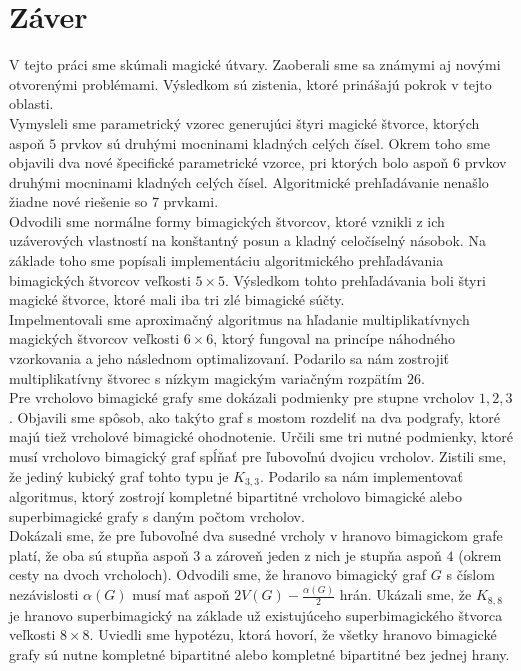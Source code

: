 \chapter*{Záver}  %

V tejto práci sme skúmali magické útvary. Zaoberali sme sa známymi aj novými otvorenými problémami. Výsledkom sú zistenia, ktoré prinášajú pokrok v tejto oblasti. \\

Vymysleli sme parametrický vzorec generujúci štyri magické štvorce, ktorých aspoň $5$ prvkov sú druhými mocninami kladných celých čísel. Okrem toho sme objavili dva nové špecifické parametrické vzorce, pri ktorých bolo aspoň $6$ prvkov druhými mocninami kladných celých čísel. Algoritmické prehľadávanie nenašlo žiadne nové riešenie so $7$ prvkami. \\

Odvodili sme normálne formy bimagických štvorcov, ktoré vznikli z ich uzáverových vlastností na konštantný posun a kladný celočíselný násobok. Na základe toho sme popísali implementáciu algoritmického prehľadávania bimagických štvorcov veľkosti $5 \times 5$. Výsledkom tohto prehľadávania boli štyri magické štvorce, ktoré mali iba tri zlé bimagické súčty. \\

Impelmentovali sme aproximačný algoritmus na hľadanie multiplikatívnych magických štvorcov veľkosti $6 \times 6$, ktorý fungoval na princípe náhodného vzorkovania a jeho následnom optimalizovaní. Podarilo sa nám zostrojiť multiplikatívny štvorec s nízkym magickým variačným rozpätím $26$. \\

Pre vrcholovo bimagické grafy sme dokázali podmienky pre stupne vrcholov $1, 2, 3$. Objavili sme spôsob, ako takýto graf s mostom rozdeliť na dva podgrafy, ktoré majú tiež vrcholové bimagické ohodnotenie. Určili sme tri nutné podmienky, ktoré musí vrcholovo bimagický graf spĺňať pre ľubovoľnú dvojicu vrcholov. Zistili sme, že jediný kubický graf tohto typu je $K_{3,3}$. Podarilo sa nám implementovať algoritmus, ktorý zostrojí kompletné bipartitné vrcholovo bimagické alebo superbimagické grafy s daným počtom vrcholov. \\

Dokázali sme, že pre ľubovoľné dva susedné vrcholy v hranovo bimagickom grafe platí, že oba sú stupňa aspoň $3$ a zároveň jeden z nich je stupňa aspoň $4$ (okrem cesty na dvoch vrcholoch). Odvodili sme, že hranovo bimagický graf $G$ s číslom nezávislosti $\alpha (G)$ musí mať aspoň $2 V(G) - \frac{\alpha (G)}{2}$ hrán. Ukázali sme, že $K_{8,8}$ je hranovo superbimagický na základe už existujúceho superbimagického štvorca veľkosti $8 \times 8$. Uviedli sme hypotézu, ktorá hovorí, že všetky hranovo bimagické grafy sú nutne kompletné bipartitné alebo kompletné bipartitné bez jednej hrany. \\

